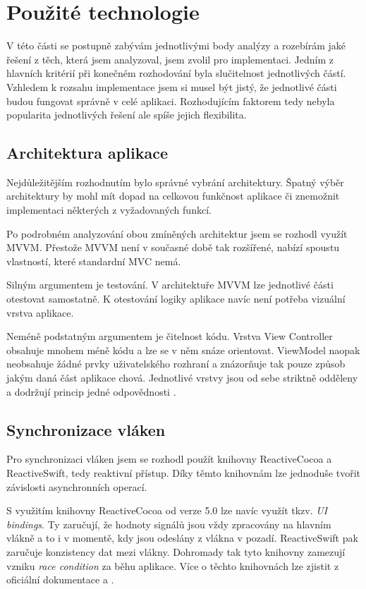 \section{Použité technologie}

V této části se postupně zabývám jednotlivými body analýzy a rozebírám jaké řešení z těch, která jsem analyzoval, jsem zvolil pro implementaci.
Jedním z hlavních kritérií při konečném rozhodování byla slučitelnost jednotlivých částí.
Vzhledem k rozsahu implementace jsem si musel být jistý, že jednotlivé části budou fungovat správně v celé aplikaci.
Rozhodujícím faktorem tedy nebyla popularita jednotlivých řešení ale spíše jejich flexibilita.

\subsection{Architektura aplikace}\label{technologie-architektura}

Nejdůležitějším rozhodnutím bylo správné vybrání architektury.
Špatný výběr architektury by mohl mít dopad na celkovou funkčnost aplikace či znemožnit implementaci některých z vyžadovaných funkcí.

Po podrobném analyzování obou zmíněných architektur jsem se rozhodl využít MVVM.
Přestože MVVM není v současné době tak rozšířené, nabízí spoustu vlastností, které standardní MVC nemá.

Silným argumentem je testování.
V architektuře MVVM lze jednotlivé části otestovat samostatně.
K otestování logiky aplikace navíc není potřeba vizuální vrstva aplikace.

Neméně podstatným argumentem je čitelnost kódu.
Vrstva View Controller obsahuje mnohem méně kódu a lze se v něm snáze orientovat.
ViewModel naopak neobsahuje žádné prvky uživatelského rozhraní a znázorňuje tak pouze způsob jakým daná část aplikace chová.
Jednotlivé vrstvy jsou od sebe striktně odděleny a dodržují princip jedné odpovědnosti \cite{toptal-srp}.

\subsection{Synchronizace vláken}

Pro synchronizaci vláken jsem se rozhodl použít knihovny ReactiveCocoa a ReactiveSwift, tedy reaktivní přístup.
Díky těmto knihovnám lze jednoduše tvořit závislosti asynchronních operací.

S využitím knihovny ReactiveCocoa od verze 5.0 lze navíc využít tkzv. \textit{UI bindings}.
Ty zaručují, že hodnoty signálů jsou vždy zpracovány na hlavním vlákně a to i v momentě, kdy jsou odeslány z vlákna v pozadí.
ReactiveSwift pak zaručuje konzistency dat mezi vlákny.
Dohromady tak tyto knihovny zamezují vzniku \textit{race condition} za běhu aplikace.
Více o těchto knihovnách lze zjistit z oficiální dokumentace \cite{github-reactiveswift} a \cite{github-reactivecocoa}.

